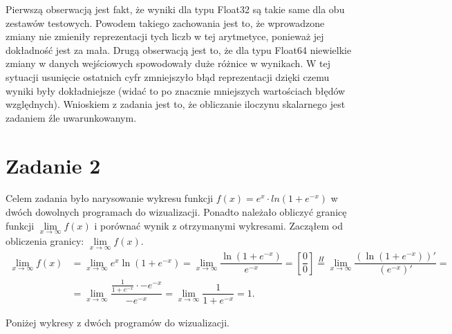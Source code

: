 \documentclass[]{article}
\begin{document}
Pierwszą obserwacją jest fakt, że wyniki dla typu Float32 są takie same dla obu zestawów testowych. Powodem takiego zachowania jest to, że wprowadzone zmiany nie zmieniły reprezentacji tych liczb w tej arytmetyce, ponieważ jej dokładność jest za mała. Drugą obserwacją jest to, że dla typu Float64 niewielkie zmiany w danych wejściowych spowodowały duże różnice w wynikach. W tej sytuacji usunięcie ostatnich cyfr zmniejszyło błąd reprezentacji dzięki czemu wyniki były dokładniejsze (widać to po znacznie mniejszych wartościach błędów względnych). Wnioskiem z zadania jest to, że obliczanie iloczynu skalarnego jest zadaniem źle uwarunkowanym.


	
	
	\section*{Zadanie 2}
	
	Celem zadania było narysowanie wykresu funkcji $f(x) = e^{x}\cdot ln(1+e^{-x})$ w dwóch dowolnych programach do wizualizacji. Ponadto należało obliczyć granicę funkcji \(\lim\limits_{x \to \infty}f(x)\) i porównać wynik z otrzymanymi wykresami. Zacząłem od obliczenia granicy: \(\lim\limits_{x \to \infty}f(x).\)
\begin{equation}
\begin{aligned}
\mathop {\lim }\limits_{x \to \infty} f(x) &= \mathop {\lim }\limits_{x \to \infty} e^x \ln(1 + e^{-x}) = \mathop {\lim }\limits_{x \to \infty} \dfrac{\ln(1 + e^{-x})}{e^{-x}} = \left[\dfrac{0}{0}\right] \stackrel{H}{=} \mathop {\lim }\limits_{x \to \infty} \dfrac{(\ln(1 + e^{-x}))'}{(e^{-x})'} = \\ 
&= \mathop {\lim }\limits_{x \to \infty} \dfrac{\frac{1}{1 + e^{-x}}\cdot -e^{-x}}{-e^{-x}} = \mathop {\lim }\limits_{x \to \infty} \dfrac{1}{1 + e^{-x}} = 1. \nonumber
\end{aligned}
\end{equation}
	
	 Poniżej wykresy z dwóch programów do wizualizacji.
	
\end{document}
